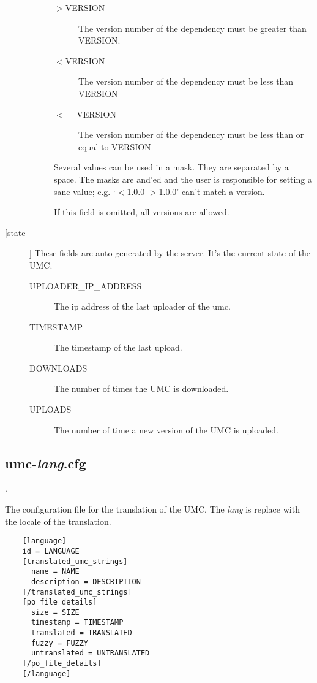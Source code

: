 \begin{description}
\begin{description}
\begin{description}
	\item[$>$VERSION]
		The version number of the dependency must be greater than VERSION.

	\item[$<$VERSION]
		The version number of the dependency must be less than VERSION
	\item[$<=$VERSION]
		The version number of the dependency must be less than or equal to
		VERSION

	\end{description}
	Several values can be used in a mask. They are separated by a space. The
	masks are and'ed and the user is responsible for setting a sane value;
	e.g. `$<$1.0.0 $>$1.0.0' can't match a version.

	If this field is omitted, all versions are allowed.

\end{description}

\item [[state]] These fields are auto-generated by the server. It's the current state of the UMC.

\begin{description}
\item[UPLOADER\_IP\_ADDRESS]
  The ip address of the last uploader of the umc.

\item[TIMESTAMP]
  The timestamp of the last upload. 

\item[DOWNLOADS]
  The number of times the UMC is downloaded.

\item[UPLOADS]
  The number of time a new version of the UMC is uploaded.

\end{description}
\end{description}


\subsection{umc-\emph{lang}.cfg}
\label{section:communication_protocol:server:umc-lang.cfg}.

The configuration file for the translation of the UMC. The
\emph{lang} is replace with the locale of the translation.

\begin{lstlisting}
	[language]
    id = LANGUAGE
    [translated_umc_strings]
      name = NAME
      description = DESCRIPTION
    [/translated_umc_strings]
    [po_file_details]
      size = SIZE
      timestamp = TIMESTAMP
      translated = TRANSLATED
      fuzzy = FUZZY
      untranslated = UNTRANSLATED
    [/po_file_details]
	[/language]
\end{lstlisting}

